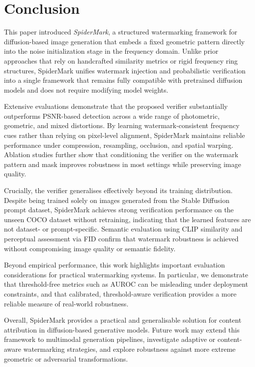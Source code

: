 \section{Conclusion}

This paper introduced \textit{SpiderMark}, a structured watermarking framework for diffusion-based image generation that embeds a fixed geometric pattern directly into the noise initialization stage in the frequency domain. Unlike prior approaches that rely on handcrafted similarity metrics or rigid frequency ring structures, SpiderMark unifies watermark injection and probabilistic verification into a single framework that remains fully compatible with pretrained diffusion models and does not require modifying model weights.

Extensive evaluations demonstrate that the proposed verifier substantially outperforms PSNR-based detection across a wide range of photometric, geometric, and mixed distortions. By learning watermark-consistent frequency cues rather than relying on pixel-level alignment, SpiderMark maintains reliable performance under compression, resampling, occlusion, and spatial warping. Ablation studies further show that conditioning the verifier on the watermark pattern and mask improves robustness in most settings while preserving image quality.

Crucially, the verifier generalises effectively beyond its training distribution. Despite being trained solely on images generated from the Stable Diffusion prompt dataset, SpiderMark achieves strong verification performance on the unseen COCO dataset without retraining, indicating that the learned features are not dataset- or prompt-specific. Semantic evaluation using CLIP similarity and perceptual assessment via FID confirm that watermark robustness is achieved without compromising image quality or semantic fidelity.

Beyond empirical performance, this work highlights important evaluation considerations for practical watermarking systems. In particular, we demonstrate that threshold-free metrics such as AUROC can be misleading under deployment constraints, and that calibrated, threshold-aware verification provides a more reliable measure of real-world robustness.

Overall, SpiderMark provides a practical and generalisable solution for content attribution in diffusion-based generative models. Future work may extend this framework to multimodal generation pipelines, investigate adaptive or content-aware watermarking strategies, and explore robustness against more extreme geometric or adversarial transformations.

